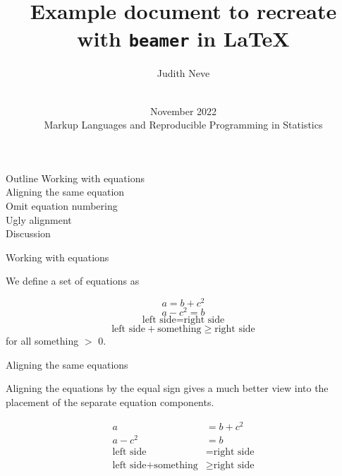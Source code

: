 \documentclass[aspectratio=169]{beamer} %
\title{Example document to recreate with \texttt{beamer} in \LaTeX}
\author{Judith Neve}
\date{\vspace{.5 in}\\ November 2022 \\ Markup Languages and Reproducible Programming in Statistics  \vskip6mm} %
\begin{document}
  \titlepage

\begin{frame}{Outline}
Working with equations\\
\hspace*{20pt} Aligning the same equation\\
\hspace*{20pt} Omit equation numbering\\
\hspace*{20pt} Ugly alignment\\
\vspace*{20pt}
Discussion

\end{frame}
\begin{frame}{Working with equations}

We define a set of equations as

\begin{equation}
    a = b + c^2
\end{equation}
\begin{equation}
    a - c^2 = b
\end{equation}
\begin{equation}
    \text{left side} = \text{right side}
\end{equation}
\begin{equation}
    \text{left side} + \text{something} \geq \text{right side}
\end{equation}
for all something $>$ 0.

\end{frame}

\begin{frame}{Aligning the same equations}

Aligning the equations by the equal sign gives a much better view into the placement of the separate equation components.

\begin{align}
    a & = b + c^2\\
    a - c^2 & = b\\
    \text{left side} & = \text{right side}\\
    \text{left side} + \text{something} & \geq \text{right side}
\end{align}

\end{frame}
\end{document}

